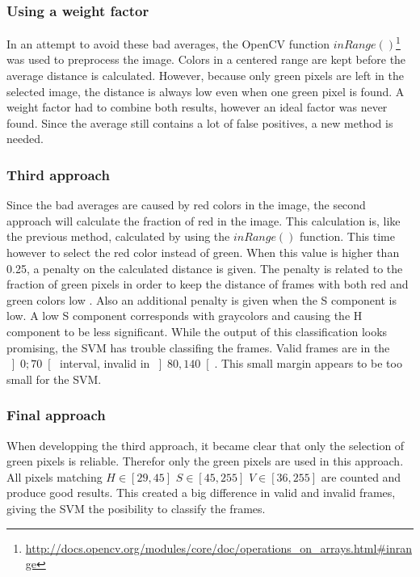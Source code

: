 
\clearpage
\subsubsection{Using a weight factor}
In an attempt to avoid these bad averages, the OpenCV function \(inRange()\)\footnote{\url{http://docs.opencv.org/modules/core/doc/operations_on_arrays.html\#inrange}} was used to preprocess the image. Colors in a centered range are kept before the average distance is calculated. However, because only green pixels are left in the selected image, the distance is always low even when one green pixel is found. A weight factor had to combine both results, however an ideal factor was never found. Since the average still contains a lot of false positives, a new method is needed.

\subsubsection{Third approach}
Since the bad averages are caused by red colors in the image, the second approach will calculate the fraction of red in the image. This calculation is, like the previous method, calculated by using the \(inRange()\) function. This time
however to select the red color instead of green. When this value is higher than 0.25, a penalty on the calculated
distance is given. The penalty is related to the fraction of green pixels in order to keep the distance of frames with
both red and green colors low . Also an additional penalty is given when the S component is low. A low S component
corresponds with graycolors and causing the H component to be less significant.
\npar
While the output of this classification looks promising, the SVM has trouble classifing the frames. Valid frames are in
the \(\left]0;70\right[\) interval, invalid in \(\left]80,140\right[\). This small margin appears to be too small for
the SVM.

\subsubsection{Final approach}
\npar
When developping the third approach, it became clear that only the selection of green pixels is reliable. Therefor only
the green pixels are used in this approach. All pixels matching \(H \in \left[29,45\right]\) \(S \in
\left[45,255\right]\) \(V \in \left[36,255\right]\) are counted and produce good results. This created a big difference
in valid and invalid frames, giving the SVM the posibility to classify the frames.

